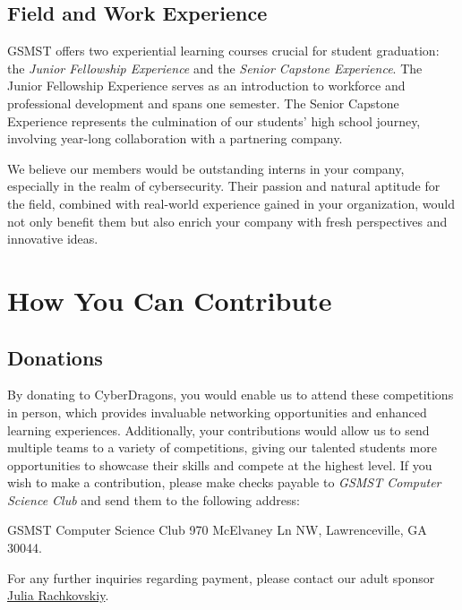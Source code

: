 \documentclass[
  letterpaper,
  DIV=11,
  numbers=noendperiod]{scrartcl}
\begin{document}
\hypertarget{field-and-work-experience}{%
\subsection{Field and Work Experience}\label{field-and-work-experience}}

GSMST offers two experiential learning courses crucial for student
graduation: the \emph{Junior Fellowship Experience} and the \emph{Senior
Capstone Experience}. The Junior Fellowship Experience serves as an
introduction to workforce and professional development and spans one
semester. The Senior Capstone Experience represents the culmination of
our students' high school journey, involving year-long collaboration
with a partnering company.

We believe our members would be outstanding interns in your company,
especially in the realm of cybersecurity. Their passion and natural
aptitude for the field, combined with real-world experience gained in
your organization, would not only benefit them but also enrich your
company with fresh perspectives and innovative ideas.

\newpage{}

\hypertarget{how-you-can-contribute}{%
\section{How You Can Contribute}\label{how-you-can-contribute}}

\hypertarget{donations}{%
\subsection{Donations}\label{donations}}

By donating to CyberDragons, you would enable us to attend these
competitions in person, which provides invaluable networking
opportunities and enhanced learning experiences. Additionally, your
contributions would allow us to send multiple teams to a variety of
competitions, giving our talented students more opportunities to
showcase their skills and compete at the highest level. If you wish to
make a contribution, please make checks payable to \emph{GSMST Computer
Science Club} and send them to the following address:

GSMST Computer Science Club 970 McElvaney Ln NW, Lawrenceville, GA
30044.

For any further inquiries regarding payment, please contact our adult
sponsor \href{mailto:Julia.Rachkovskiy@gcpsk12.org}{Julia Rachkovskiy}.
\end{document}
